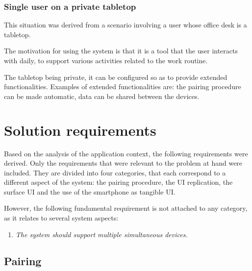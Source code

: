 \subsubsection{Single user on a private tabletop}

This situation was derived from a scenario involving a user whose office desk is a tabletop.

The motivation for using the system is that it is a tool that the user interacts with daily, to support various activities related to the work routine.

The tabletop being private, it can be configured so as to provide extended functionalities.
Examples of extended functionalities are: the pairing procedure can be made automatic, data can be shared between the devices.


\section{Solution requirements}
\label{sec:requirements}

Based on the analysis of the application context, the following requirements were derived.
Only the requirements that were relevant to the problem at hand were included.
They are divided into four categories, that each correspond to a different aspect of the system: the pairing procedure, the UI replication, the surface UI and the use of the smartphone as tangible UI.

However, the following fundamental requirement is not attached to any category, as it relates to several system aspects:
\begin{enumerate}[{R}-1]
\item \emph{The system should support multiple simultaneous devices.}
\end{enumerate}

\subsection{Pairing}


